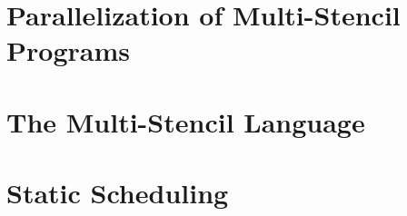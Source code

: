 \documentclass[twocolumn]{svjour3}          %
\begin{document}
\section{Parallelization of Multi-Stencil Programs}
\label{sect:parallelism}

\section{The Multi-Stencil Language}
\label{sect:msl}

\section{Static Scheduling}
\label{sect:msp}

\end{document}
